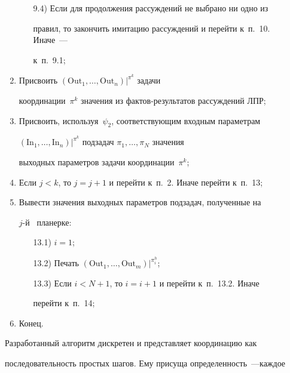 \begin{multicols}{2}
\begin{enumerate}[1)]
\begin{itemize}
\item[9.4)] Если для продолжения рассуждений не выбрано ни одно из 


правил, то закончить имитацию рассуждений и перейти к~п.~10. Иначе~--- 


к~п.~9.1;


\end{itemize}


\item Присвоить $(\mathrm{Out}_1, \ldots , \mathrm{Out}_n)\vert^{\pi^k}$ задачи 


координации~$\pi^k$ значения из фактов-результатов рассуждений ЛПР;


\item Присвоить, используя~$\psi_2$, соответствующим входным параметрам 


$(\mathrm{In}_1,  \ldots , \mathrm{In}_n)\vert^{\pi^k}$ подзадач $\pi_1, \ldots ,\pi_N$ значения 


выходных параметров задачи координации~$\pi^k$;


\item Если $j < k$, то $j = j + 1$ и перейти к~п.~2. Иначе перейти к~п.~13;


\item Вывести значения выходных параметров подзадач, полученные на 


$j$-й ~планерке:


\begin{itemize}


\item[13.1)] $i = 1$;


\item[13.2)] Печать $(\mathrm{Out}_1, \ldots ,\mathrm{Out}_m)\vert^{\pi_i^h}$;


\item[13.3)] Если $i < N + 1$, то $i = i + 1$ и перейти к~п.~13.2. Иначе 


перейти к~п.~14;


\end{itemize}


\item Конец.


\end{enumerate}


  


  Разработанный алгоритм дискретен и пред\-ставля\-ет координацию как 


последовательность прос\-тых шагов. Ему присуща определенность~---\linebreak каждое 



\end{multicols}

